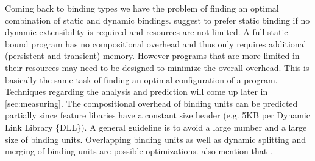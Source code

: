 Coming back to binding types we have the problem of finding an optimal combination of static and dynamic bindings. \citet{CombiningStaticandDynamicFeatureBinding} suggest to prefer static binding if no dynamic extensibility is required and resources are not limited. A full static bound program has no compositional overhead and thus only requires additional (persistent and transient) memory. However programs that are more limited in their resources may need to be designed to minimize the overall overhead. This is basically the same task of finding an optimal configuration of a program. Techniques regarding the analysis and prediction will come up later in \cref{sec:measuring}. The compositional overhead of binding units can be predicted partially since feature libaries have a constant size header (e.g. 5KB per Dynamic Link Library \{DLL\}). A general guideline is to avoid a large number and a large size of binding units. Overlapping binding units as well as dynamic splitting and merging of binding units are possible optimizations. \citet{CombiningStaticandDynamicFeatureBinding} also mention that .
